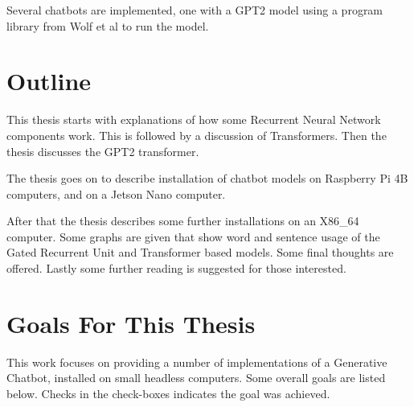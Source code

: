 Several chatbots are implemented, one with a GPT2 model using a program library from Wolf et al \cite{Wolf2019HuggingFacesTS} to run the model.

\section{Outline}
This thesis starts with explanations of how some Recurrent Neural Network components work. This is followed by a discussion of Transformers. Then the thesis discusses the GPT2 transformer.

The thesis goes on to describe installation of chatbot models on Raspberry Pi 4B computers, and on a Jetson Nano computer.

After that the thesis describes some further installations on an X86\_64 computer. Some graphs are given that show word and sentence usage of the Gated Recurrent Unit and Transformer based models. Some final thoughts are offered. Lastly some further reading is suggested for those interested.


\section{Goals For This Thesis}
This work focuses on providing a number of implementations of a Generative Chatbot, installed on small headless computers. Some overall goals are listed below. Checks in the check-boxes indicates the goal was achieved.

